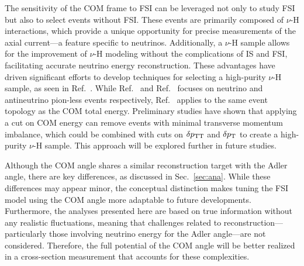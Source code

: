      The sensitivity of the COM frame to FSI can be leveraged not only to study FSI but also to select events without FSI. 
     These events are primarily composed of $\nu$-H interactions, which provide a unique opportunity for precise measurements of the axial current—a feature specific to neutrinos. 
     Additionally, a $\nu$-H sample allows for the improvement of $\nu$-H modeling without the complications of IS and FSI, facilitating accurate neutrino energy reconstruction. 
     These advantages have driven significant efforts to develop techniques for selecting a high-purity $\nu$-H sample, as seen in Ref.~\cite{Lu:2015hea,MINERvA:2023avz,Baudis:2023tma}.
     While Ref.~\cite{Baudis:2023tma} and Ref.~\cite{MINERvA:2023avz} focuses on neutrino and antineutrino pion-less events respectively, Ref.~\cite{Lu:2015hea} applies to the same event topology as the COM total energy. 
     Preliminary studies have shown that applying a cut on COM energy can remove events with minimal transverse momentum imbalance, which could be combined with cuts on $\delta p_\textrm{TT}$ and $\delta p_\textrm{T}$ to create a high-purity $\nu$-H sample. 
     This approach will be explored further in future studies.

     Although the COM angle shares a similar reconstruction target with the Adler angle, there are key differences, as discussed in Sec.~\ref{sec:ana}. 
     While these differences may appear minor, the conceptual distinction makes tuning the FSI model using the COM angle more adaptable to future developments. 
     Furthermore, the analyses presented here are based on true information without any realistic fluctuations, meaning that challenges related to reconstruction—particularly those involving neutrino energy for the Adler angle—are not considered. 
     Therefore, the full potential of the COM angle will be better realized in a cross-section measurement that accounts for these complexities.

